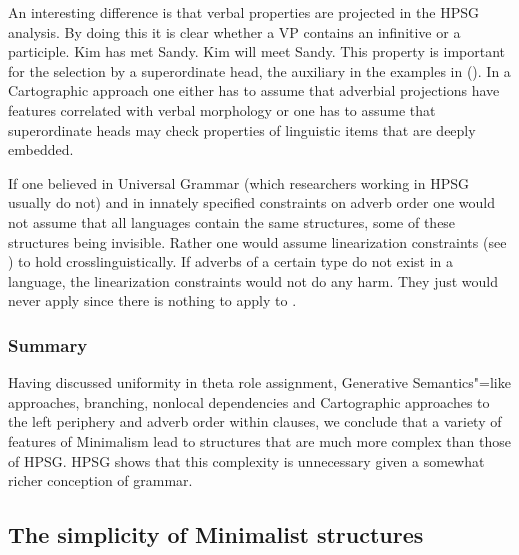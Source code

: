 \documentclass[output=paper]{langsci/langscibook}
\begin{document}
An interesting difference is that verbal properties are projected in the HPSG analysis. By doing
this it is clear whether a VP contains an infinitive or a participle.
\eal
\ex Kim has met Sandy.
\ex Kim will meet Sandy.
\zl
This property is important for the selection by a superordinate head, the auxiliary in the examples
in (). In a Cartographic approach one either has to assume that adverbial projections have
features correlated with verbal morphology or one has to assume that superordinate heads may check
properties of linguistic items that are deeply embedded.

If one believed in Universal Grammar (which researchers working in HPSG usually do not) and in innately specified constraints on adverb order
one would not assume that all languages contain the same structures, some of these structures being
invisible. Rather one would assume linearization constraints (see ) to hold crosslinguistically. If adverbs
of a certain type do not exist in a language, the linearization constraints would not do any
harm. They just would never apply since there is nothing to apply to \citep[]{MuellerCoreGram}.

\subsubsection{Summary}

Having discussed uniformity in theta role assignment, Generative Semantics"=like approaches,
branching, nonlocal dependencies and Cartographic approaches to the left periphery and adverb 
order within clauses,  we conclude that a variety of features of Minimalism lead to structures that
are much more complex than those of HPSG. HPSG shows that this complexity is unnecessary given a
somewhat richer conception of grammar. 

\subsection{The simplicity of Minimalist structures}
\label{subsec:min-simplicity}
\end{document}
